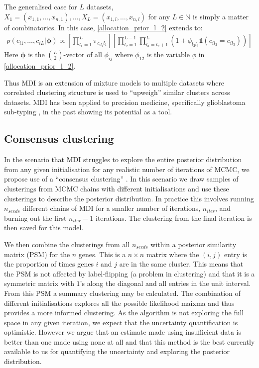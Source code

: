 \documentclass[12pt]{article} %
\begin{document}
	The generalised case for $L$ datasets, $X_1 = (x_{1,1},\ldots,x_{n,1}),\ldots, X_L = (x_{1,l},\ldots,x_{n,l})$ for any $L \in \mathbb{N}$ is simply a matter of combinatorics. In this case, \eqref{allocation_prior_l_2} extends to:
	\begin{align} \label{allocation_prior}
	p(c_{i1},\ldots,c_{iL} | \boldsymbol{\phi}) \propto \left[\prod_{l_1=1}^L\pi_{c_{il_1}l_1} \right]\left[\prod_{l_2=1}^{L-1}\prod_{l_3=l_2+1}^L\left(1+\phi_{l_2l_3}\mathbb{1}(c_{il_2} = c_{il_3}) \right)\right]
	\end{align}
	Here $\boldsymbol{\phi}$ is the ${L \choose 2}$-vector of all $\phi_{ij}$ where $\phi_{12}$ is the variable $\phi$ in \eqref{allocation_prior_l_2}.

	Thus MDI is an extension of mixture models to multiple datasets where correlated clustering structure is used to ``upweigh'' similar clusters across datasets. MDI has been applied to precision medicine, specifically glioblastoma sub-typing \cite{SavageIdentifyingcancersubtypes2013a}, in the past showing its potential as a tool.
	
	\subsection{Consensus clustering} \label{sec:consensus_clustering}
	In the scenario that MDI struggles to explore the entire posterior distribution from any given initialisation for any realistic number of iterations of MCMC, we propose use of a ``consensus clustering'' \cite{MontiConsensusClusteringResamplingBased}. In this scenario we draw samples of clusterings from MCMC chains with different initialisations and use these clusterings to describe the posterior distribution. In practice this involves running $n_{seeds}$ different chains of MDI for a smaller number of iterations, $n_{iter}$, and burning out the first $n_{iter} - 1$ iterations. The clustering from the final iteration is then saved for this model.
	
	We then combine the clusterings from all $n_{seeds}$ within a posterior similarity matrix (PSM) for the $n$ genes. This is a $n \times n$ matrix where the $(i,j)$ entry is the proportion of times genes $i$ and $j$ are in the same cluster. This means that the PSM is not affected by label-flipping (a problem in clustering) and that it is a symmetric matrix with $1$'s along the diagonal and all entries in the unit interval. From this PSM a summary clustering may be calculated. The combination of different initialisations explores all the possible likelihood maixma and thus provides a more informed clustering. As the algorithm is not exploring the full space in any given iteration, we expect that the uncertainty quantification is optimistic. However we argue that an estimate made using insufficient data is better than one made using none at all and that this method is the best currently available to us for quantifying the uncertainty and exploring the posterior distribution.
	
\end{document}
